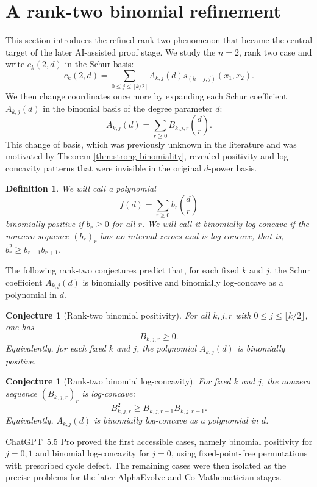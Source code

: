 \documentclass[11pt]{amsart}
\numberwithin{equation}{section}
\newtheorem{conjecture}[theorem]{Conjecture}
\newtheorem{definition}[theorem]{Definition}
\theoremstyle{remark}
\begin{document}
\section{A rank-two binomial refinement}

This section introduces the refined rank-two phenomenon that became the central target of the later AI-assisted proof stage.
We study the $n=2$, rank two case and write $c_k(2,d)$ in the Schur basis:
\[
  c_k(2,d)=\sum_{0\le j\le\lfloor k/2\rfloor}A_{k,j}(d)s_{(k-j,j)}(x_1,x_2).
\]
We then change coordinates once more by expanding each Schur coefficient $A_{k,j}(d)$ in the binomial basis of the degree parameter $d$:
\[
  A_{k,j}(d)=\sum_{r\ge0} B_{k,j,r}\binom{d}{r}.
\]
This change of basis, which was previously unknown in the literature and was motivated by Theorem \ref{thm:strong-binomiality}, revealed positivity and log-concavity patterns that were invisible in the original $d$-power basis.  

\begin{definition}\label{def:binom} We will call a polynomial
\[
  f(d)=\sum_{r\ge0} b_r\binom{d}{r}
\]
\emph{binomially positive} if $b_r\ge0$ for all $r$.  We will call it \emph{binomially log-concave} if the nonzero sequence $(b_r)_r$ has no internal zeroes and is log-concave, that is, $b_r^2\ge b_{r-1}b_{r+1}$.
\end{definition}
The following rank-two conjectures predict that, for each fixed $k$ and $j$, the Schur coefficient $A_{k,j}(d)$ is binomially positive and binomially log-concave as a polynomial in $d$.  


\begin{conjecture}[Rank-two binomial positivity]\label{conj:A}
For all $k,j,r$ with $0\le j\le\lfloor k/2\rfloor$, one has
\[
  B_{k,j,r}\ge0.
\]
Equivalently, for each fixed $k$ and $j$, the polynomial $A_{k,j}(d)$ is binomially positive.
\end{conjecture}

\begin{conjecture}[Rank-two binomial log-concavity]\label{conj:B}
For fixed $k$ and $j$, the nonzero sequence $(B_{k,j,r})_r$ is log-concave:
\[
  B_{k,j,r}^2\ge B_{k,j,r-1}B_{k,j,r+1}.
\]
Equivalently, $A_{k,j}(d)$ is binomially log-concave as a polynomial in $d$.
\end{conjecture}

ChatGPT~5.5 Pro proved the first accessible cases, namely binomial positivity for $j=0,1$ and binomial log-concavity for $j=0$, using fixed-point-free permutations with prescribed cycle defect.  The remaining cases were then isolated as the precise problems for the later AlphaEvolve and Co-Mathematician stages.
\end{document}
